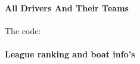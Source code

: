 \documentclass[a4paper,10pt,english]{sphinxmanual}
\begin{document}
\paragraph{All Drivers And Their Teams}
\label{developer/member2:all-drivers-and-their-teams}\begin{quote}

\end{quote}

The code:
\begin{quote}

\end{quote}


\paragraph{League ranking and boat info's}
\label{developer/member2:league-ranking-and-boat-info-s}\begin{quote}

\end{quote}
\end{document}
